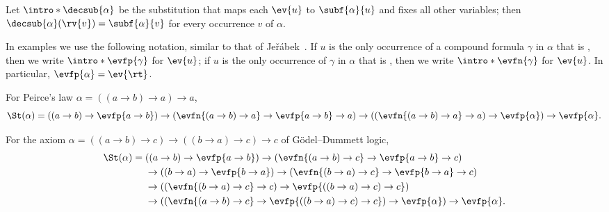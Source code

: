 \AP Let $\intro*\decsub{\alpha}$ be the substitution that maps each
$\ev{u}$ to $\subf{\alpha}{u}$ and fixes all other variables; then
$\decsub{\alpha}(\rv{v})=\subf{\alpha}{v}$ for every occurrence $v$ of
$\alpha$.


\AP In examples we use the following notation, similar to that of
Jeřábek~\cite[Def.~3.6]{Jer16}. If $u$ is the only occurrence of a compound
formula $\gamma$ in $\alpha$ that is , then we write
$\intro*\evfp{\gamma}$ for $\ev{u}$; if $u$ is the only occurrence of
$\gamma$ in $\alpha$ that is , then we write
$\intro*\evfn{\gamma}$ for $\ev{u}$. In particular, $\evfp{\alpha}=\ev{\rt}$.

\begin{example}\label{ex:peirce}
For Peirce's law $\alpha=((a\to b)\to a)\to a$,
\[
\St(\alpha)=((a\to b)\to\evfp{a\to b})\to(\evfn{(a\to b)\to a}\to\evfp{a\to b}\to a)
\to((\evfn{(a\to b)\to a}\to a)\to\evfp{\alpha})\to\evfp{\alpha}.
\]
\end{example}

\begin{example}\label{ex:lc}
For the axiom $\alpha=((a\to b)\to c)\to((b\to a)\to c)\to c$ of
Gödel--Dummett logic,
\[
\begin{aligned}
\St(\alpha)={}&((a\to b)\to\evfp{a\to b})\to(\evfn{(a\to b)\to c}\to\evfp{a\to b}\to c)\\
&\to((b\to a)\to\evfp{b\to a})\to(\evfn{(b\to a)\to c}\to\evfp{b\to a}\to c)\\
&\to((\evfn{(b\to a)\to c}\to c)\to\evfp{((b\to a)\to c)\to c})\\
&\to((\evfn{(a\to b)\to c}\to\evfp{((b\to a)\to c)\to c})\to\evfp{\alpha})\to\evfp{\alpha}.
\end{aligned}
\]
\end{example}
